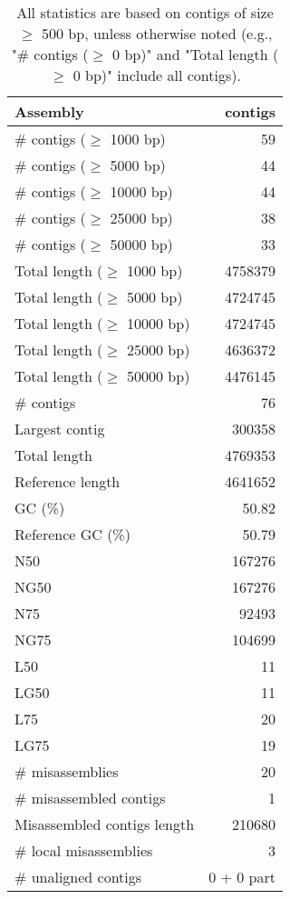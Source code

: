 \documentclass[12pt,a4paper]{article}
\begin{document}
\begin{table}[ht]
\begin{center}
\caption{All statistics are based on contigs of size $\geq$ 500 bp, unless otherwise noted (e.g., "\# contigs ($\geq$ 0 bp)" and "Total length ($\geq$ 0 bp)" include all contigs).}
\begin{tabular}{|l*{1}{|r}|}
\hline
Assembly & contigs \\ \hline
\# contigs ($\geq$ 1000 bp) & 59 \\ \hline
\# contigs ($\geq$ 5000 bp) & 44 \\ \hline
\# contigs ($\geq$ 10000 bp) & 44 \\ \hline
\# contigs ($\geq$ 25000 bp) & 38 \\ \hline
\# contigs ($\geq$ 50000 bp) & 33 \\ \hline
Total length ($\geq$ 1000 bp) & 4758379 \\ \hline
Total length ($\geq$ 5000 bp) & 4724745 \\ \hline
Total length ($\geq$ 10000 bp) & 4724745 \\ \hline
Total length ($\geq$ 25000 bp) & 4636372 \\ \hline
Total length ($\geq$ 50000 bp) & 4476145 \\ \hline
\# contigs & 76 \\ \hline
Largest contig & 300358 \\ \hline
Total length & 4769353 \\ \hline
Reference length & 4641652 \\ \hline
GC (\%) & 50.82 \\ \hline
Reference GC (\%) & 50.79 \\ \hline
N50 & 167276 \\ \hline
NG50 & 167276 \\ \hline
N75 & 92493 \\ \hline
NG75 & 104699 \\ \hline
L50 & 11 \\ \hline
LG50 & 11 \\ \hline
L75 & 20 \\ \hline
LG75 & 19 \\ \hline
\# misassemblies & 20 \\ \hline
\# misassembled contigs & 1 \\ \hline
Misassembled contigs length & 210680 \\ \hline
\# local misassemblies & 3 \\ \hline
\# unaligned contigs & 0 + 0 part \\ \hline

\end{tabular}
\end{center}
\end{table}
\end{document}
